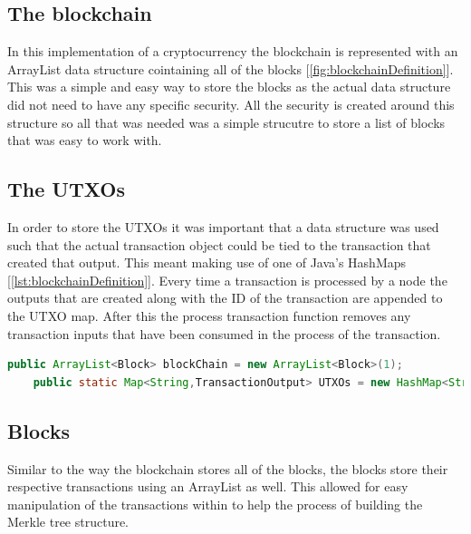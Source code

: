 \documentclass{l4proj}
\begin{document}
\subsection{The blockchain}
In this implementation of a cryptocurrency the blockchain is represented with an ArrayList data structure cointaining
all of the blocks [\ref{fig:blockchainDefinition}]. This was a simple and easy way to store the blocks as the actual data structure did not need to
have any specific security. All the security is created around this structure so all that was needed was a simple 
strucutre to store a list of blocks that was easy to work with. 



\subsection{The UTXOs}
In order to store the UTXOs it was important that a data structure was used such that the actual transaction
object could be tied to the transaction that created that output. This meant making use of one of Java's HashMaps
[\ref{lst:blockchainDefinition}]. Every time a transaction is processed by a node the outputs that are created 
along with the ID of the transaction are appended to the UTXO map. After this the process transaction function 
removes any transaction inputs that have been consumed in the process of the transaction.

\begin{lstlisting}[language=java, float, caption={This figure shows the definitions for the blockchain and also 
    the UTXO maps. The blockchain is an ArrayList created with one starting block acting as a genesis block. The 
    UTXO map is a HashMap mapping the transaction id to the transaction output created from each transaction.}, label=lst:blockchainDefinition]
    public ArrayList<Block> blockChain = new ArrayList<Block>(1);
    public static Map<String,TransactionOutput> UTXOs = new HashMap<String,TransactionOutput>();
\end{lstlisting}

\subsection{Blocks}
Similar to the way the blockchain stores all of the blocks, the blocks store their respective transactions 
using an ArrayList as well. This allowed for easy manipulation of the transactions within to help the process of
building the Merkle tree structure.
\end{document}
